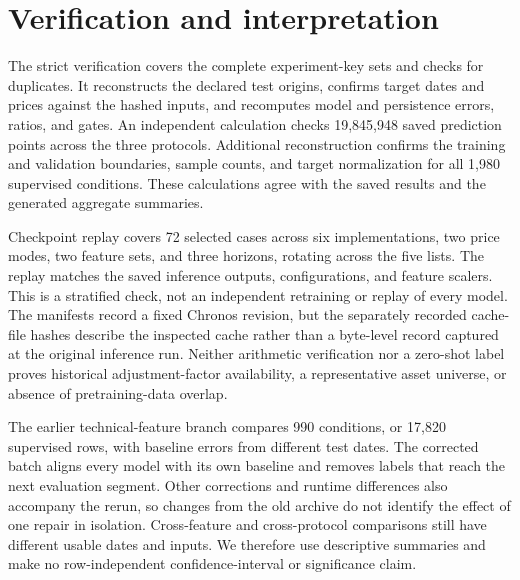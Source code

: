 \section{Verification and interpretation}

The strict verification covers the complete experiment-key sets and checks for duplicates. It reconstructs the declared test origins, confirms target dates and prices against the hashed inputs, and recomputes model and persistence errors, ratios, and gates. An independent calculation checks 19,845,948 saved prediction points across the three protocols. Additional reconstruction confirms the training and validation boundaries, sample counts, and target normalization for all 1,980 supervised conditions. These calculations agree with the saved results and the generated aggregate summaries.

Checkpoint replay covers 72 selected cases across six implementations, two price modes, two feature sets, and three horizons, rotating across the five lists. The replay matches the saved inference outputs, configurations, and feature scalers. This is a stratified check, not an independent retraining or replay of every model. The manifests record a fixed Chronos revision, but the separately recorded cache-file hashes describe the inspected cache rather than a byte-level record captured at the original inference run. Neither arithmetic verification nor a zero-shot label proves historical adjustment-factor availability, a representative asset universe, or absence of pretraining-data overlap.

The earlier technical-feature branch compares 990 conditions, or 17,820 supervised rows, with baseline errors from different test dates. The corrected batch aligns every model with its own baseline and removes labels that reach the next evaluation segment. Other corrections and runtime differences also accompany the rerun, so changes from the old archive do not identify the effect of one repair in isolation. Cross-feature and cross-protocol comparisons still have different usable dates and inputs. We therefore use descriptive summaries and make no row-independent confidence-interval or significance claim.
